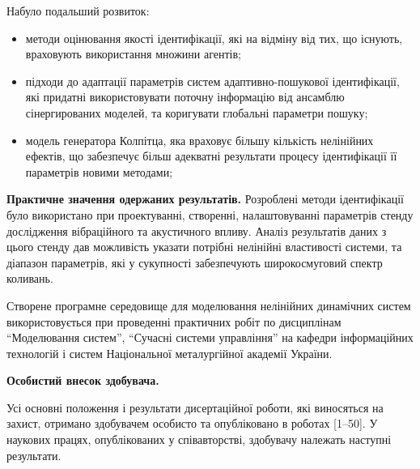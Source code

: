 \documentclass[a4paper,13pt]{atuaref}
\begin{document}
\noindent
Набуло подальший розвиток:
\begin{itemize}

  \item
  методи оцінювання якості ідентифікації,
  які на відміну від тих, що існують,
  враховують використання множини агентів;

  \item
  підходи до адаптації параметрів систем
  адаптивно-пошукової ідентифікації, які придатні використовувати поточну
  інформацію від ансамблю сінергированих моделей, та коригувати глобальні
  параметри пошуку;

  \item
    модель генератора Колпітца, яка враховує
    більшу кількість нелінійних ефектів,
    що забезпечує більш адекватні результати процесу
    ідентифікації її параметрів новими методами;

\end{itemize}


\smallskip
\textbf{Практичне значення одержаних результатів.}
Розроблені методи ідентифікації було використано
при проектуванні, створенні, налаштовуванні параметрів
стенду дослідження вібраційного та акустичного впливу.
Аналіз результатів даних з цього стенду
дав можливість указати потрібні нелінійні властивості системи,
та діапазон параметрів, які у сукупності
забезпечують широкосмуговий спектр коливань.

Створене програмне середовище для моделювання нелінійних динамічних систем
використовується при проведенні практичних робіт по дисциплінам
``Моделювання систем'',
``Сучасні системи управління'' на кафедри інформаційних технологій
і систем Національної металургійної академії України.


\smallskip
\textbf{Особистий внесок здобувача.}

Усі основні положення і результати
дисертаційної роботи, які виносяться на захист, отримано здобувачем особисто та
опубліковано в роботах [1--50]. У наукових працях, опублікованих у співавторстві,
здобувачу належать наступні результати.

\end{document}
